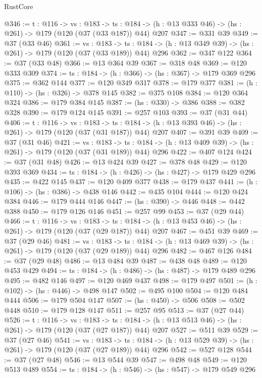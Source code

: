 \begin{lexlean}{RustCore}
\begin{coremodule}
@346 := {t : @116} ->
  {vs : @183} ->
  {ts : @184} -> (h : @13 @333 @46) -> (hs : @261) -> @179 (@120 (@37 (@33 @187)) @44) @207
@347 := @331 @39
@349 := @37 (@33 @46)
@361 := {vs : @183} ->
  {ts : @184} -> (h : @13 @349 @39) -> (hs : @261) -> @179 (@120 (@37 (@33 @189)) @44) @296
@362 := @347 @122
@364 := @37 (@33 @48)
@366 := @13 @364 @39
@367 := @318 @48
@369 := @120 @333 @309
@374 := {ts : @184} -> (h : @366) -> (hs : @367) -> @179 @369 @296
@375 := @362 @144
@377 := @120 @349 @317
@378 := @179 @377
@381 := (h : @110) -> (hs : @326) -> @378 @145
@382 := @375 @108
@384 := @120 @364 @324
@386 := @179 @384 @145
@387 := (hs : @330) -> @386
@388 := @382 @328
@390 := @179 @124 @145
@391 := @257 @103
@393 := @37 (@31 @44)
@406 := {t : @116} ->
  {vs : @183} ->
  {ts : @184} -> (h : @13 @393 @46) -> (hs : @261) -> @179 (@120 (@37 (@31 @187)) @44) @207
@407 := @391 @39
@409 := @37 (@31 @46)
@421 := {vs : @183} ->
  {ts : @184} -> (h : @13 @409 @39) -> (hs : @261) -> @179 (@120 (@37 (@31 @189)) @44) @296
@422 := @407 @124
@424 := @37 (@31 @48)
@426 := @13 @424 @39
@427 := @378 @48
@429 := @120 @393 @369
@434 := {ts : @184} -> (h : @426) -> (hs : @427) -> @179 @429 @296
@435 := @422 @145
@437 := @120 @409 @377
@438 := @179 @437
@441 := (h : @106) -> (hs : @386) -> @438 @146
@442 := @435 @104
@444 := @120 @424 @384
@446 := @179 @444 @146
@447 := (hs : @390) -> @446
@448 := @442 @388
@450 := @179 @126 @146
@451 := @257 @99
@453 := @37 (@29 @44)
@466 := {t : @116} ->
  {vs : @183} ->
  {ts : @184} -> (h : @13 @453 @46) -> (hs : @261) -> @179 (@120 (@37 (@29 @187)) @44) @207
@467 := @451 @39
@469 := @37 (@29 @46)
@481 := {vs : @183} ->
  {ts : @184} -> (h : @13 @469 @39) -> (hs : @261) -> @179 (@120 (@37 (@29 @189)) @44) @296
@482 := @467 @126
@484 := @37 (@29 @48)
@486 := @13 @484 @39
@487 := @438 @48
@489 := @120 @453 @429
@494 := {ts : @184} -> (h : @486) -> (hs : @487) -> @179 @489 @296
@495 := @482 @146
@497 := @120 @469 @437
@498 := @179 @497
@501 := (h : @102) -> (hs : @446) -> @498 @147
@502 := @495 @100
@504 := @120 @484 @444
@506 := @179 @504 @147
@507 := (hs : @450) -> @506
@508 := @502 @448
@510 := @179 @128 @147
@511 := @257 @95
@513 := @37 (@27 @44)
@526 := {t : @116} ->
  {vs : @183} ->
  {ts : @184} -> (h : @13 @513 @46) -> (hs : @261) -> @179 (@120 (@37 (@27 @187)) @44) @207
@527 := @511 @39
@529 := @37 (@27 @46)
@541 := {vs : @183} ->
  {ts : @184} -> (h : @13 @529 @39) -> (hs : @261) -> @179 (@120 (@37 (@27 @189)) @44) @296
@542 := @527 @128
@544 := @37 (@27 @48)
@546 := @13 @544 @39
@547 := @498 @48
@549 := @120 @513 @489
@554 := {ts : @184} -> (h : @546) -> (hs : @547) -> @179 @549 @296

\end{coremodule}
\end{lexlean}
